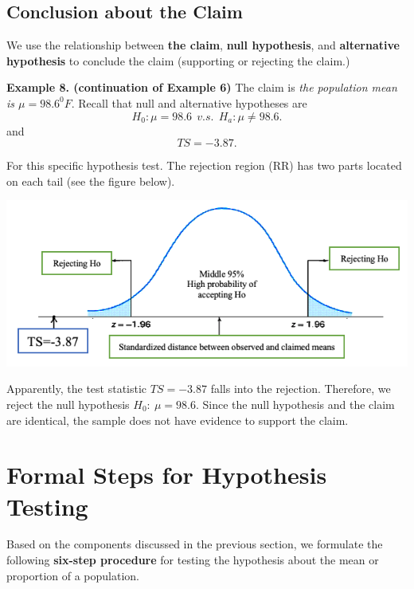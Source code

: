 \documentclass[
]{book}
\begin{document}
\hfill\break

\hypertarget{conclusion-about-the-claim}{%
\subsection{Conclusion about the Claim}\label{conclusion-about-the-claim}}

We use the relationship between \textbf{the claim}, \textbf{null hypothesis}, and \textbf{alternative hypothesis} to conclude the claim (supporting or rejecting the claim.)

\hfill\break

\textbf{Example 8. (continuation of Example 6) } The claim is \emph{the population mean is \(\mu = 98.6^0F\)}. Recall that null and alternative hypotheses are
\[ H_0: \mu = 98.6  \ \ v.s. \ \ H_a: \mu \ne 98.6.\]
and
\[
TS = -3.87.
\]

For this specific hypothesis test. The rejection region (RR) has two parts located on each tail (see the figure below).

\begin{center}\includegraphics[width=0.7\linewidth]{week08/example07DecisionRule} \end{center}

Apparently, the test statistic \(TS = -3.87\) falls into the rejection. Therefore, we reject the null hypothesis \(H_0: \ \mu = 98.6\). Since the null hypothesis and the claim are identical, the sample does not have evidence to support the claim.

\hfill\break

\hypertarget{formal-steps-for-hypothesis-testing}{%
\section{Formal Steps for Hypothesis Testing}\label{formal-steps-for-hypothesis-testing}}

Based on the components discussed in the previous section, we formulate the following \textbf{six-step procedure} for testing the hypothesis about the mean or proportion of a population.
\end{document}
